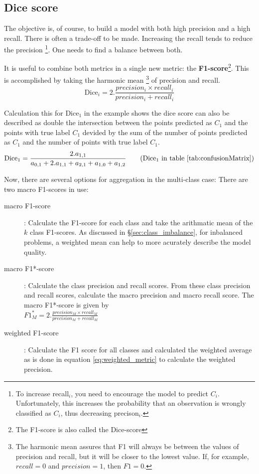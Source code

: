 \subsection{Dice score\label{sec:dice}}
\par{
    The objective is, of course, to build a model with both high precision and a high recall.
    There is often a trade-off to be made. 
    Increasing the recall tends to reduce the precision
    \footnote{To increase recall$_i$, you need to encourage the model to predict $C_i$. Unfortunately, this increases the probability that an observation is wrongly classified as $C_i$, thus decreasing precison$_i$.}.
    One needs to find a balance between both.
}
\newpage
\par{It is useful to combine both metrics in a single new metric: the \textbf{F1-score}\footnote{The F1-score is also called the Dice-score}. This is accomplished by taking the harmonic mean
\footnote{The harmonic mean assures that F1 will always be between the values of precision and recall, but it will be closer to the lowest value. If, for example, $recall=0$ and $precision=1$, then $F1=0$.} of precision and recall.
\begin{equation}
    \text{Dice}_i = 2 . \frac{precision_i \times recall_i }{precision_i + recall_i }
\end{equation}
}
\par{
    Calculation this for Dice$_1$ in the example shows the dice score can also be described as double the intersection 
    between the points predicted as $C_1$ and the points with true label $C_1$ devided by the sum of the number of points predicted as $C_1$ and the number of points with true label $C_1$.
    \begin{equation}
        \text{Dice}_1 = \frac{2.a_{1,1}}{a_{0,1} + 2.a_{1,1} + a_{2, 1} + a_{1,0} + a_{1,2}} \tag{Dice$_1$ in table \ref{tab:confusionMatrix}}
    \end{equation}
}
\par{
    Now, there are several options for aggregation in the multi-class case:
    There are two macro F1-scores in use:
    \begin{description}
        \item[macro F1-score]: Calculate the F1-score for each class and take the arithmatic mean of the $k$ class F1-scores. As discussed in §\ref{sec:class_imbalance}, for inbalanced problems, a weighted mean can help to more acurately describe the model quality.
        \item[macro F1*-score]: Calculate the class precision and recall scores. From these class precision and recall scores, calculate the macro precision and macro recall score. 
        The macro F1*-score is given by\\ $F1_M^*=2 . \frac{precision_M \times recall_M }{precision_M + recall_M }$
        \item[weighted F1-score]: Calculate the F1 score for all classes and calculated the weighted average as is done in equation \ref{eq:weighted_metric} to calculate the weighted precision.
    \end{description}
}
